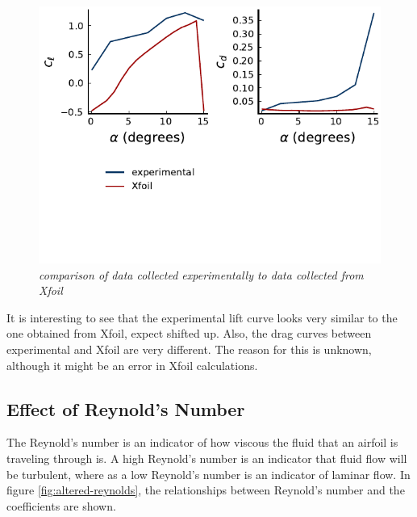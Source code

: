 \documentclass{journal}
\begin{document}
	\begin{figure}
		\centering
		\includegraphics{../graphics/airfoil-compare.pdf}
		\caption{\emph{comparison of data collected experimentally to data collected from Xfoil}}
		\label{fig:airfoil-comparison}
	\end{figure}

	It is interesting to see that the experimental lift curve looks very similar to the one obtained from Xfoil, expect shifted up. Also, the drag curves between experimental and Xfoil are very different. The reason for this is unknown, although it might be an error in Xfoil calculations.
	
	\subsection{Effect of Reynold's Number}
	The Reynold's number is an indicator of how viscous the fluid that an airfoil is traveling through is. A high Reynold's number is an indicator that fluid flow will be turbulent, where as a low Reynold's number is an indicator of laminar flow. In figure \ref{fig:altered-reynolds}, the relationships between Reynold's number and the coefficients are shown.
	
\end{document}
